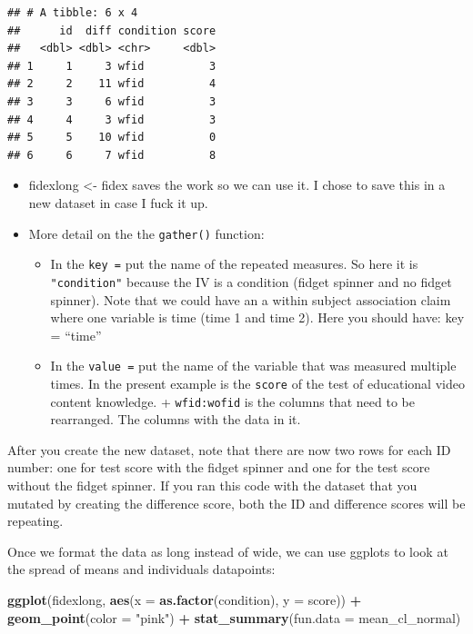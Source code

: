\documentclass[
]{book}
\newenvironment{Shaded}{\begin{snugshade}}{\end{snugshade}}
\newcommand{\DataTypeTok}[1]{\textcolor[rgb]{0.13,0.29,0.53}{#1}}
\newcommand{\KeywordTok}[1]{\textcolor[rgb]{0.13,0.29,0.53}{\textbf{#1}}}
\newcommand{\NormalTok}[1]{#1}
\newcommand{\OperatorTok}[1]{\textcolor[rgb]{0.81,0.36,0.00}{\textbf{#1}}}
\newcommand{\StringTok}[1]{\textcolor[rgb]{0.31,0.60,0.02}{#1}}
\providecommand{\tightlist}{%
  \setlength{\itemsep}{0pt}\setlength{\parskip}{0pt}}
\begin{document}
\begin{verbatim}
## # A tibble: 6 x 4
##      id  diff condition score
##   <dbl> <dbl> <chr>     <dbl>
## 1     1     3 wfid          3
## 2     2    11 wfid          4
## 3     3     6 wfid          3
## 4     4     3 wfid          3
## 5     5    10 wfid          0
## 6     6     7 wfid          8
\end{verbatim}

\begin{itemize}
\tightlist
\item
  fidexlong \textless- fidex saves the work so we can use it. I chose to save this in a new dataset in case I fuck it up.\\
\item
  More detail on the the \texttt{gather()} function:

  \begin{itemize}
  \tightlist
  \item
    In the \texttt{key\ =} put the name of the repeated measures. So here it is \texttt{"condition"} because the IV is a condition (fidget spinner and no fidget spinner). Note that we could have an a within subject association claim where one variable is time (time 1 and time 2). Here you should have: key = ``time''\\
  \item
    In the \texttt{value\ =} put the name of the variable that was measured multiple times. In the present example is the \texttt{score} of the test of educational video content knowledge. + \texttt{wfid:wofid} is the columns that need to be rearranged. The columns with the data in it.
  \end{itemize}
\end{itemize}

After you create the new dataset, note that there are now two rows for each ID number: one for test score with the fidget spinner and one for the test score without the fidget spinner. If you ran this code with the dataset that you mutated by creating the difference score, both the ID and difference scores will be repeating.

Once we format the data as long instead of wide, we can use ggplots to look at the spread of means and individuals datapoints:

\begin{Shaded}
\begin{Highlighting}[]
\KeywordTok{ggplot}\NormalTok{(fidexlong, }\KeywordTok{aes}\NormalTok{(}\DataTypeTok{x =} \KeywordTok{as.factor}\NormalTok{(condition), }\DataTypeTok{y =}\NormalTok{ score)) }\OperatorTok{+}
\StringTok{  }\KeywordTok{geom_point}\NormalTok{(}\DataTypeTok{color =} \StringTok{"pink"}\NormalTok{) }\OperatorTok{+}
\StringTok{  }\KeywordTok{stat_summary}\NormalTok{(}\DataTypeTok{fun.data =}\NormalTok{ mean_cl_normal)}
\end{Highlighting}
\end{Shaded}
\end{document}
